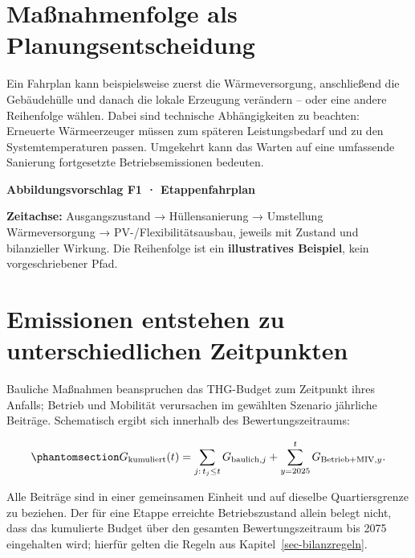 \documentclass[
  ngerman,
  a4paper,
  DIV=11]{scrreprt}
\begin{document}
\section{Maßnahmenfolge als
Planungsentscheidung}\label{mauxdfnahmenfolge-als-planungsentscheidung}

Ein Fahrplan kann beispielsweise zuerst die Wärmeversorgung,
anschließend die Gebäudehülle und danach die lokale Erzeugung verändern
-- oder eine andere Reihenfolge wählen. Dabei sind technische
Abhängigkeiten zu beachten: Erneuerte Wärmeerzeuger müssen zum späteren
Leistungsbedarf und zu den Systemtemperaturen passen. Umgekehrt kann das
Warten auf eine umfassende Sanierung fortgesetzte Betriebsemissionen
bedeuten.

\begin{tcolorbox}[enhanced jigsaw, arc=.35mm, bottomrule=.15mm, breakable, colback=white, colframe=quarto-callout-note-color-frame, left=2mm, leftrule=.75mm, opacityback=0, rightrule=.15mm, toprule=.15mm]

\vspace{-3mm}\textbf{Abbildungsvorschlag F1 · Etappenfahrplan}\vspace{3mm}

\textbf{Zeitachse:} Ausgangszustand → Hüllensanierung → Umstellung
Wärmeversorgung → PV-/Flexibilitätsausbau, jeweils mit Zustand und
bilanzieller Wirkung. Die Reihenfolge ist ein \textbf{illustratives
Beispiel}, kein vorgeschriebener Pfad.

\end{tcolorbox}

\section{Emissionen entstehen zu unterschiedlichen
Zeitpunkten}\label{emissionen-entstehen-zu-unterschiedlichen-zeitpunkten}

Bauliche Maßnahmen beanspruchen das THG-Budget zum Zeitpunkt ihres
Anfalls; Betrieb und Mobilität verursachen im gewählten Szenario
jährliche Beiträge. Schematisch ergibt sich innerhalb des
Bewertungszeitraums:

\begin{equation}\protect\phantomsection\label{eq-etappenbudget}{
G_{\mathrm{kumuliert}}(t)
=\sum_{j:\,t_j\leq t}G_{\mathrm{baulich},j}
+\sum_{y=2025}^{t}G_{\mathrm{Betrieb+MIV},y}.
}\end{equation}

Alle Beiträge sind in einer gemeinsamen Einheit und auf dieselbe
Quartiersgrenze zu beziehen. Der für eine Etappe erreichte
Betriebszustand allein belegt nicht, dass das kumulierte Budget über den
gesamten Bewertungszeitraum bis 2075 eingehalten wird; hierfür gelten
die Regeln aus Kapitel~\ref{sec-bilanzregeln}.
\end{document}
